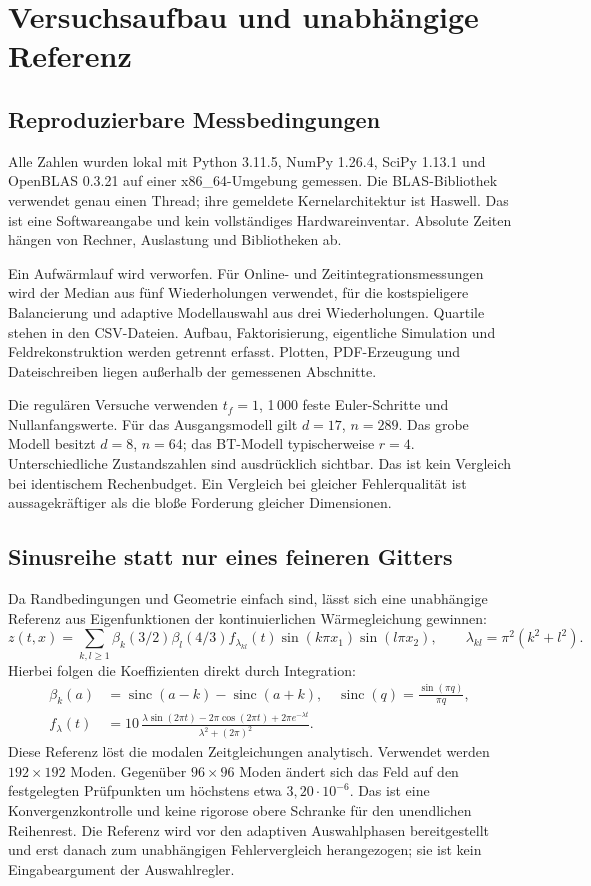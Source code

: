 \section{Versuchsaufbau und unabhängige Referenz}
\subsection{Reproduzierbare Messbedingungen}
Alle Zahlen wurden lokal mit Python 3.11.5, NumPy 1.26.4, SciPy 1.13.1 und OpenBLAS 0.3.21 auf einer x86\_64-Umgebung gemessen. Die BLAS-Bibliothek verwendet genau einen Thread; ihre gemeldete Kernelarchitektur ist Haswell. Das ist eine Softwareangabe und kein vollständiges Hardwareinventar. Absolute Zeiten hängen von Rechner, Auslastung und Bibliotheken ab.

Ein Aufwärmlauf wird verworfen. Für Online- und Zeitintegrationsmessungen wird der Median aus fünf Wiederholungen verwendet, für die kostspieligere Balancierung und adaptive Modellauswahl aus drei Wiederholungen. Quartile stehen in den CSV-Dateien. Aufbau, Faktorisierung, eigentliche Simulation und Feldrekonstruktion werden getrennt erfasst. Plotten, PDF-Erzeugung und Dateischreiben liegen außerhalb der gemessenen Abschnitte.

Die regulären Versuche verwenden $t_f=1$, 1\,000 feste Euler-Schritte und Nullanfangswerte. Für das Ausgangsmodell gilt $d=17$, $n=289$. Das grobe Modell besitzt $d=8$, $n=64$; das BT-Modell typischerweise $r=4$. Unterschiedliche Zustandszahlen sind ausdrücklich sichtbar. Das ist kein Vergleich bei identischem Rechenbudget. Ein Vergleich bei gleicher Fehlerqualität ist aussagekräftiger als die bloße Forderung gleicher Dimensionen.

\subsection{Sinusreihe statt nur eines feineren Gitters}
Da Randbedingungen und Geometrie einfach sind, lässt sich eine unabhängige Referenz aus Eigenfunktionen der kontinuierlichen Wärmegleichung gewinnen:
\begin{equation}
 z(t,x)=\sum_{k,l\ge1}\beta_k(3/2)\beta_l(4/3)f_{\lambda_{kl}}(t)
 \sin(k\pi x_1)\sin(l\pi x_2),\qquad \lambda_{kl}=\pi^2(k^2+l^2).
\end{equation}
Hierbei folgen die Koeffizienten direkt durch Integration:
\begin{align}
 \beta_k(a)&=\operatorname{sinc}(a-k)-\operatorname{sinc}(a+k),\quad
 \operatorname{sinc}(q)=\frac{\sin(\pi q)}{\pi q},\\
 f_\lambda(t)&=10\,\frac{\lambda\sin(2\pi t)-2\pi\cos(2\pi t)+2\pi e^{-\lambda t}}
 {\lambda^2+(2\pi)^2}.
\end{align}
Diese Referenz löst die modalen Zeitgleichungen analytisch. Verwendet werden $192\times192$ Moden. Gegenüber $96\times96$ Moden ändert sich das Feld auf den festgelegten Prüfpunkten um höchstens etwa $3{,}20\cdot10^{-6}$. Das ist eine Konvergenzkontrolle und keine rigorose obere Schranke für den unendlichen Reihenrest. Die Referenz wird vor den adaptiven Auswahlphasen bereitgestellt und erst danach zum unabhängigen Fehlervergleich herangezogen; sie ist kein Eingabeargument der Auswahlregler.

